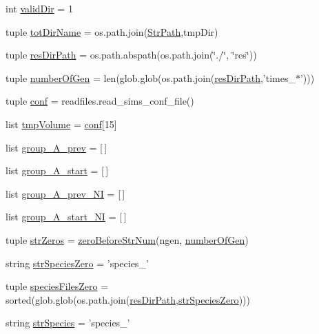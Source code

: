 \begin{DoxyCompactItemize}
\item 
int \hyperlink{a00099_aebb18ab2b73e7e2705ee42c728c0a72b}{valid\-Dir} = 1
\item 
tuple \hyperlink{a00099_af4bd99f6cdaec32f48ed0074208b4f0c}{tot\-Dir\-Name} = os.\-path.\-join(\hyperlink{a00099_ac34f3f43f888eb6620266d78ce928ceb}{Str\-Path},tmp\-Dir)
\item 
tuple \hyperlink{a00099_ab3da7da39258338965b6eef645a913ee}{res\-Dir\-Path} = os.\-path.\-abspath(os.\-path.\-join(\char`\"{}./\char`\"{}, \char`\"{}res\char`\"{}))
\item 
tuple \hyperlink{a00099_a54acb4eba0735e72c2a820383febd37f}{number\-Of\-Gen} = len(glob.\-glob(os.\-path.\-join(\hyperlink{a00099_ab3da7da39258338965b6eef645a913ee}{res\-Dir\-Path},'times\-\_\-$\ast$')))
\item 
tuple \hyperlink{a00099_ab8d1341009c3207d501833ef63593ffa}{conf} = readfiles.\-read\-\_\-sims\-\_\-conf\-\_\-file()
\item 
list \hyperlink{a00099_a1d189b8706c1c2299764d3cfd2ba08d9}{tmp\-Volume} = \hyperlink{a00099_ab8d1341009c3207d501833ef63593ffa}{conf}\mbox{[}15\mbox{]}
\item 
list \hyperlink{a00099_a1dd2f2c85f697e454c99be1a157d6c17}{group\-\_\-\-A\-\_\-prev} = \mbox{[}$\,$\mbox{]}
\item 
list \hyperlink{a00099_a3898175300d001a17a60c23656d2812f}{group\-\_\-\-A\-\_\-start} = \mbox{[}$\,$\mbox{]}
\item 
list \hyperlink{a00099_a4d77133a6a303d9486944707f3310cf8}{group\-\_\-\-A\-\_\-prev\-\_\-\-N\-I} = \mbox{[}$\,$\mbox{]}
\item 
list \hyperlink{a00099_aedb746884c5ae6e301c8ad2d8307fe4d}{group\-\_\-\-A\-\_\-start\-\_\-\-N\-I} = \mbox{[}$\,$\mbox{]}
\item 
tuple \hyperlink{a00099_a292c23aa303304f24632662a5dfbfa23}{str\-Zeros} = \hyperlink{a00099_aeeb6d629132a9755b45a3008d445419c}{zero\-Before\-Str\-Num}(ngen, \hyperlink{a00099_a54acb4eba0735e72c2a820383febd37f}{number\-Of\-Gen})
\item 
string \hyperlink{a00099_a52f7239b2be2cb978182547960b6c46e}{str\-Species\-Zero} = 'species\-\_\-'
\item 
tuple \hyperlink{a00099_a5584994da277e7798c904342dff18427}{species\-Files\-Zero} = sorted(glob.\-glob(os.\-path.\-join(\hyperlink{a00099_ab3da7da39258338965b6eef645a913ee}{res\-Dir\-Path},\hyperlink{a00099_a52f7239b2be2cb978182547960b6c46e}{str\-Species\-Zero})))
\item 
string \hyperlink{a00099_ab14d209fe558e83aeede3b657a7241bb}{str\-Species} = 'species\-\_\-'

\end{DoxyCompactItemize}
